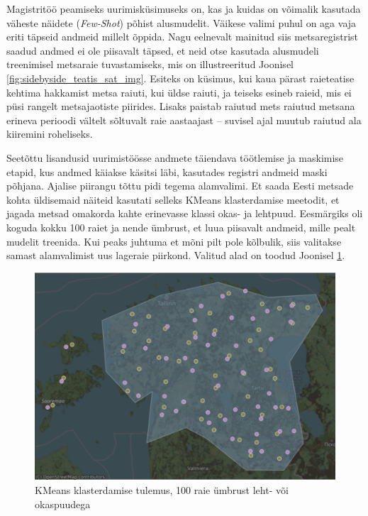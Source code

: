 Magistritöö peamiseks uurimisküsimuseks on, kas ja kuidas on võimalik kasutada väheste näidete (\textit{Few-Shot}) põhist alusmudelit. Väikese valimi puhul on aga vaja eriti täpseid andmeid millelt õppida. Nagu eelnevalt mainitud siis metsaregistrist saadud andmed ei ole piisavalt täpsed, et neid otse kasutada alusmudeli treenimisel metsaraie tuvastamiseks, mis on illustreeritud Joonisel \ref{fig:sidebyside_teatis_sat_img}. Esiteks on küsimus, kui kaua pärast raieteatise kehtima hakkamist metsa raiuti, kui üldse raiuti, ja teiseks esineb raieid, mis ei püsi rangelt metsajaotiste piirides. Lisaks paistab raiutud mets raiutud metsana erineva perioodi vältelt sõltuvalt raie aastaajast -- suvisel ajal muutub raiutud ala kiiremini roheliseks.

Seetõttu lisandusid uurimistöösse andmete täiendava töötlemise ja maskimise etapid, kus andmed käiakse käsitsi läbi, kasutades registri andmeid maski põhjana. Ajalise piirangu tõttu pidi tegema alamvalimi. Et saada Eesti metsade kohta üldisemaid näiteid kasutati selleks KMeans klasterdamise meetodit, et jagada metsad omakorda kahte erinevasse klassi okas- ja lehtpuud. Eesmärgiks oli koguda kokku 100 raiet ja nende ümbrust, et luua piisavalt andmeid, mille pealt mudelit treenida. Kui peaks juhtuma et mõni pilt pole kõlbulik, siis valitakse samast alamvalimist uus lageraie piirkond. Valitud alad on toodud Joonisel \ref{fig:kmeans}. 

\begin{figure}[H]
    \centering
    \includegraphics[width=.9\textwidth]{figures/andmestik/kmeansmap.png}
    \caption{KMeans klasterdamise tulemus, 100 raie ümbrust leht- või okaspuudega}
    \label{fig:kmeans}
\end{figure}



